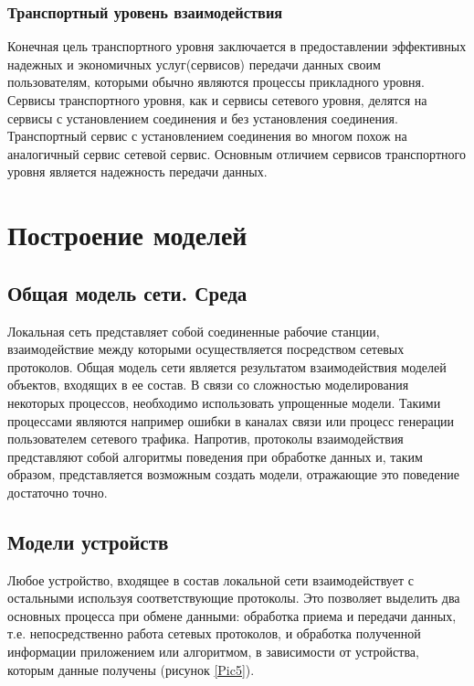     \subsubsection{Транспортный уровень взаимодействия }

    Конечная цель транспортного уровня заключается в предоставлении эффективных надежных и экономичных услуг(сервисов) передачи данных своим пользователям, которыми обычно являются процессы прикладного уровня. Сервисы транспортного уровня, как и сервисы сетевого уровня, делятся на сервисы с установлением соединения и без установления соединения. Транспортный сервис с установлением соединения во многом похож на аналогичный сервис сетевой сервис. Основным отличием сервисов транспортного уровня является надежность передачи данных.

    \section{Построение моделей }

    \subsection{Общая модель сети. Среда}


    Локальная сеть представляет собой соединенные рабочие станции, взаимодействие между которыми осуществляется посредством сетевых протоколов. Общая модель сети является результатом взаимодействия моделей объектов, входящих в ее состав. В связи со сложностью моделирования некоторых процессов, необходимо использовать упрощенные модели. Такими процессами являются например ошибки в каналах связи или процесс генерации пользователем сетевого трафика. Напротив, протоколы взаимодействия представляют собой алгоритмы поведения при обработке данных и, таким образом, представляется возможным создать модели, отражающие это поведение достаточно точно.

    \subsection{Модели устройств}

    Любое устройство, входящее в состав локальной сети взаимодействует с остальными используя соответствующие протоколы. Это позволяет выделить два основных процесса при обмене данными: обработка приема и передачи данных, т.е. непосредственно работа сетевых протоколов, и обработка полученной информации приложением или алгоритмом, в зависимости от устройства, которым данные получены (рисунок \ref{Pic5}).


